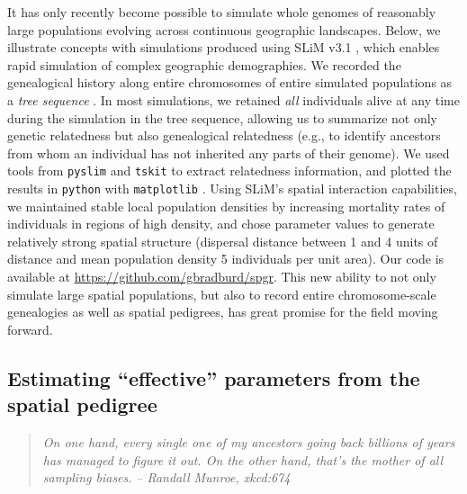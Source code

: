 \documentclass{ar-1col}
\renewcommand{\emph}[1]{{\textit{#1}}}
\begin{document}
It has only recently become possible to simulate whole genomes
of reasonably large populations
evolving across continuous geographic landscapes.
Below, 
we illustrate concepts with 
simulations 
produced using SLiM v3.1 \citep{haller2018forward},
which enables rapid simulation of complex geographic demographies.
We recorded the genealogical history along entire chromosomes
of entire simulated populations
as a \emph{tree sequence} \citep{haller2019treesequence}.
In most simulations, we retained \emph{all} individuals alive at any time during the simulation
in the tree sequence, allowing us to summarize not only genetic relatedness
but also genealogical relatedness 
(e.g., to identify ancestors from whom an individual has not inherited any parts of their genome).
We used tools from \texttt{pyslim} and \texttt{tskit} \citep{kelleher2018efficient} 
to extract relatedness information,
and plotted the results in \texttt{python} with \texttt{matplotlib} \citep{hunter2007matplotlib}.
Using SLiM's spatial interaction capabilities,
we maintained stable local population densities by increasing mortality rates of individuals
in regions of high density,
and chose parameter values to generate relatively strong spatial structure
(dispersal distance between 1 and 4 units of distance 
and mean population density 5 individuals per unit area).
Our code is available at \url{https://github.com/gbradburd/spgr}.
This new ability to not only simulate large spatial populations,
but also to record entire chromosome-scale genealogies as well as spatial pedigrees,
has great promise for the field moving forward.


\subsection{Estimating ``effective'' parameters from the spatial pedigree}

\begin{quote}
    \textit{
    On one hand, every single one of my ancestors going back billions of years
    has managed to figure it out.
    On the other hand, that's the mother of all sampling biases.}
    \hfill \textit{-- Randall Munroe, xkcd:674}
\end{quote}
\end{document}
